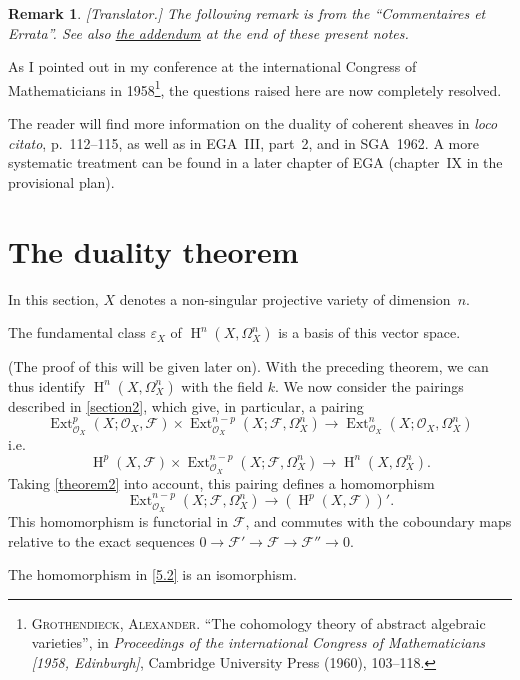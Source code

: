 \documentclass{article}
\theoremstyle{plain}
\newenvironment{theorem}[1]
  {\renewcommand\theinnercustomtheorem{#1}\innercustomtheorem}
  {\endinnercustomtheorem}
\theoremstyle{definition}
\newtheorem*{remark}{Remark}
\newcommand{\sh}[1]{{\mathscr{#1}}}
\DeclareMathOperator{\Ext}{Ext}
\DeclareMathOperator{\HH}{H}
\newcommand{\oldpage}[1]{\marginpar{\footnotesize$\Big\vert$ \textit{p.~#1}}}
\begin{document}
\begin{remark}
  \emph{[Translator.] The following remark is from the ``Commentaires et Errata''. See also \hyperref[addendum]{the addendum} at the end of these present notes.}

  As I pointed out in my conference at the international Congress of Mathematicians in 1958\footnote{\textsc{Grothendieck, Alexander.} ``The cohomology theory of abstract algebraic varieties'', in \emph{Proceedings of the international Congress of Mathematicians [1958, Edinburgh]}, Cambridge University Press (1960), 103--118.}, the questions raised here are now completely resolved.

  The reader will find more information on the duality of coherent sheaves in \emph{loco citato}, p.~112--115, as well as in EGA~III, part~2, and in SGA~1962.
  A more systematic treatment can be found in a later chapter of EGA (chapter~IX in the provisional plan).
\end{remark}


\section{The duality theorem}
\label{section5}

In this section, $X$ denotes a non-singular projective variety of dimension~$n$.

\begin{theorem}{2}
\label{theorem2}
  The fundamental class $\varepsilon_X$ of $\HH^n(X,\Omega_X^n)$ is a basis of this vector space.
\end{theorem}

(The proof of this will be given later on).
With the preceding theorem, we can thus identify $\HH^n(X,\Omega_X^n)$ with the field $k$.
We now consider the pairings described in \cref{section2}, which give, in particular, a pairing
\oldpage{149-14}
\[
  \Ext_{\sh{O}_X}^p(X;\sh{O}_X,\sh{F})\times\Ext_{\sh{O}_X}^{n-p}(X;\sh{F},\Omega_X^n) \to \Ext_{\sh{O}_X}^n(X;\sh{O}_X,\Omega_X^n)
\]
i.e.
\[
\label{5.1}
  \HH^p(X,\sh{F})\times\Ext_{\sh{O}_X}^{n-p}(X;\sh{F},\Omega_X^n) \to \HH^n(X,\Omega_X^n).
\tag{5.1}
\]
Taking \cref{theorem2} into account, this pairing defines a homomorphism
\[
\label{5.2}
  \Ext_{\sh{O}_X}^{n-p}(X;\sh{F},\Omega_X^n) \to (\HH^p(X,\sh{F}))'.
\tag{5.2}
\]
This homomorphism is functorial in $\sh{F}$, and commutes with the coboundary maps relative to the exact sequences $0\to\sh{F}'\to\sh{F}\to\sh{F}''\to0$.

\begin{theorem}{3}
\label{theorem3}
  The homomorphism in \cref{5.2} is an isomorphism.
\end{theorem}
\end{document}
